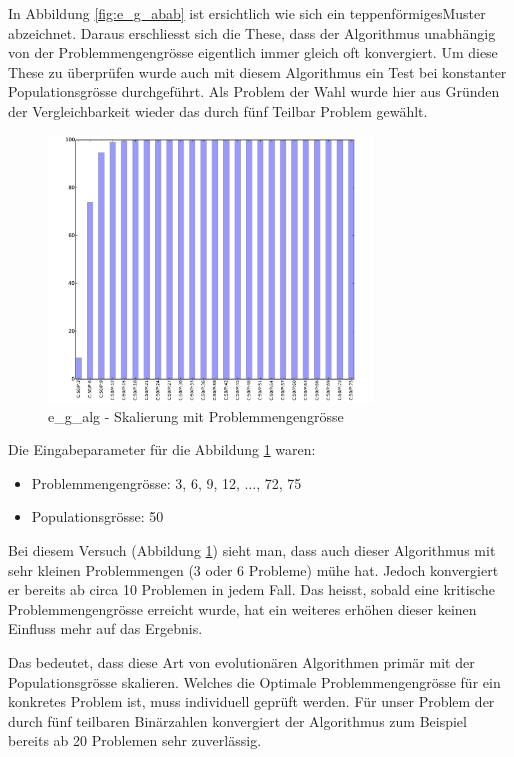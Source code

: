 In Abbildung \ref{fig:e_g_abab} ist ersichtlich wie sich ein \flqq teppenförmiges\frqq Muster abzeichnet. Daraus erschliesst sich die These, dass der Algorithmus unabhängig von der Problemmengengrösse eigentlich immer gleich oft konvergiert. Um diese These zu überprüfen wurde auch mit diesem Algorithmus ein Test bei konstanter Populationsgrösse durchgeführt. Als Problem der Wahl wurde hier aus Gründen der Vergleichbarkeit wieder das durch fünf Teilbar Problem gewählt.
\begin{figure}[H]
  \centering
  \includegraphics[width=0.77\textwidth]{images/E_G_PS_div5PS_solved.pdf}
  \caption[\Gls{e_g_alg} - Skalierung mit Problemmengengrösse]{\Gls{e_g_alg} - Skalierung mit Problemmengengrösse}
  \label{fig:e_g_ps_div5}
\end{figure}
Die Eingabeparameter für die Abbildung \ref{fig:e_g_ps_div5} waren:
\begin{itemize}
	\item Problemmengengrösse: 3, 6, 9, 12, ..., 72, 75
	\item Populationsgrösse: 50
\end{itemize}

Bei diesem Versuch (Abbildung \ref{fig:e_g_ps_div5}) sieht man, dass auch dieser Algorithmus mit sehr kleinen Problemmengen ($3$ oder $6$ Probleme) mühe hat. Jedoch konvergiert er bereits ab circa 10 Problemen in jedem Fall. Das heisst, sobald eine kritische Problemmengengrösse erreicht wurde, hat ein weiteres erhöhen dieser keinen Einfluss mehr auf das Ergebnis.

Das bedeutet, dass diese Art von evolutionären Algorithmen primär mit der Populationsgrösse skalieren. Welches die Optimale Problemmengengrösse für ein konkretes Problem ist, muss individuell geprüft werden. Für unser Problem der durch fünf teilbaren Binärzahlen konvergiert der Algorithmus zum Beispiel bereits ab 20 Problemen sehr zuverlässig.

